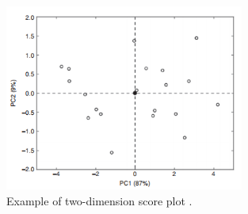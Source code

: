 %
\begin{figure}[H]
\centering
\includegraphics[width =0.7\textwidth]{Figure/PlotExample}
\caption{Example of two-dimension score plot \parencite[p. 215]{Naes2010}.}
\label{fig:PlotExample}
\end{figure}
\noindent
%